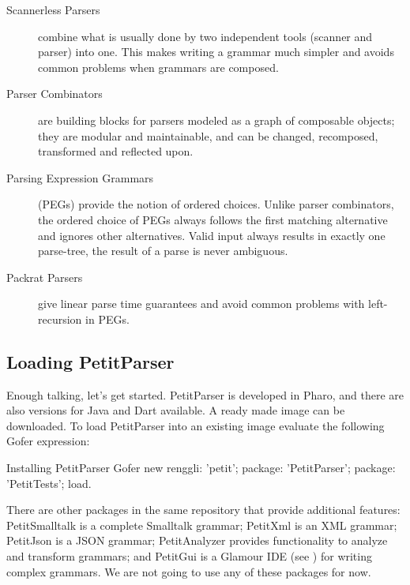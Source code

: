 \documentclass[a4paper,10pt,twoside]{book}
\begin{document}
\begin{description}
\item[Scannerless Parsers] combine what is usually done by two
  independent tools (scanner and parser) into one. This makes writing
  a grammar much simpler and avoids common problems when grammars are
  composed.

\item[Parser Combinators] are building blocks for parsers modeled as a
  graph of composable objects; they are modular and maintainable, and
  can be changed, recomposed, transformed and reflected upon.

\item[Parsing Expression Grammars] (PEGs) provide the notion of
  ordered choices. Unlike parser combinators, the ordered choice of
  PEGs always follows the first matching alternative and ignores other
  alternatives. Valid input always results in exactly one parse-tree,
  the result of a parse is never ambiguous.

\item[Packrat Parsers] give linear parse time guarantees and avoid
  common problems with left-recursion in PEGs.
\end{description}

\subsection{Loading PetitParser}

Enough talking, let's get started. PetitParser is developed in Pharo,
and there are also versions for Java and Dart available. A ready made
image can be downloaded\footnotemark. To load PetitParser into an
existing image evaluate the following Gofer expression:


\begin{script}{Installing PetitParser}
Gofer new
  renggli: 'petit';
  package: 'PetitParser';
  package: 'PetitTests';
  load.
\end{script}

There are other packages in the same repository that provide additional 
features: PetitSmalltalk is a complete Smalltalk grammar; PetitXml is an XML 
grammar; PetitJson is a JSON grammar; PetitAnalyzer provides functionality to 
analyze and transform grammars; and PetitGui is a Glamour IDE (see 
) for writing complex grammars. We are not going to use any of 
these packages for now.
\end{document}
